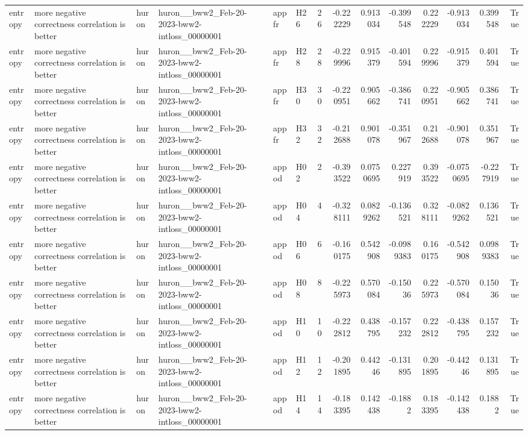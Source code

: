 \begin{longtable}{llllllrrrrrrrr}
entropy & more negative correctness correlation is better & huron & huron\_\_bww2\_Feb-20-2023-bww2-intloss\_00000001 & appfr & H26 & 26 & -0.222229 & 0.913034 & -0.399548 & 0.222229 & -0.913034 & 0.399548 & True \\
entropy & more negative correctness correlation is better & huron & huron\_\_bww2\_Feb-20-2023-bww2-intloss\_00000001 & appfr & H28 & 28 & -0.229996 & 0.915379 & -0.401594 & 0.229996 & -0.915379 & 0.401594 & True \\
entropy & more negative correctness correlation is better & huron & huron\_\_bww2\_Feb-20-2023-bww2-intloss\_00000001 & appfr & H30 & 30 & -0.220951 & 0.905662 & -0.386741 & 0.220951 & -0.905662 & 0.386741 & True \\
entropy & more negative correctness correlation is better & huron & huron\_\_bww2\_Feb-20-2023-bww2-intloss\_00000001 & appfr & H32 & 32 & -0.212688 & 0.901078 & -0.351967 & 0.212688 & -0.901078 & 0.351967 & True \\
entropy & more negative correctness correlation is better & huron & huron\_\_bww2\_Feb-20-2023-bww2-intloss\_00000001 & appod & H02 & 2 & -0.393522 & 0.0750695 & 0.227919 & 0.393522 & -0.0750695 & -0.227919 & True \\
entropy & more negative correctness correlation is better & huron & huron\_\_bww2\_Feb-20-2023-bww2-intloss\_00000001 & appod & H04 & 4 & -0.328111 & 0.0829262 & -0.136521 & 0.328111 & -0.0829262 & 0.136521 & True \\
entropy & more negative correctness correlation is better & huron & huron\_\_bww2\_Feb-20-2023-bww2-intloss\_00000001 & appod & H06 & 6 & -0.160175 & 0.542908 & -0.0989383 & 0.160175 & -0.542908 & 0.0989383 & True \\
entropy & more negative correctness correlation is better & huron & huron\_\_bww2\_Feb-20-2023-bww2-intloss\_00000001 & appod & H08 & 8 & -0.225973 & 0.570084 & -0.15036 & 0.225973 & -0.570084 & 0.15036 & True \\
entropy & more negative correctness correlation is better & huron & huron\_\_bww2\_Feb-20-2023-bww2-intloss\_00000001 & appod & H10 & 10 & -0.222812 & 0.438795 & -0.157232 & 0.222812 & -0.438795 & 0.157232 & True \\
entropy & more negative correctness correlation is better & huron & huron\_\_bww2\_Feb-20-2023-bww2-intloss\_00000001 & appod & H12 & 12 & -0.201895 & 0.44246 & -0.131895 & 0.201895 & -0.44246 & 0.131895 & True \\
entropy & more negative correctness correlation is better & huron & huron\_\_bww2\_Feb-20-2023-bww2-intloss\_00000001 & appod & H14 & 14 & -0.183395 & 0.142438 & -0.1882 & 0.183395 & -0.142438 & 0.1882 & True \\

\end{longtable}
